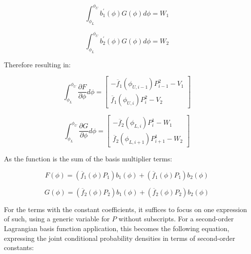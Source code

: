 \documentclass[12pt,a4paper,pagesize=pdftex]{scrartcl}
\begin{document}
\begin{equation*}
    \int_{\phi_L}^{\phi_U} b_1^\prime \left(\phi\right) G\left(\phi\right) d\phi = W_1
\end{equation*}

\begin{equation*}
    \int_{\phi_L}^{\phi_U} b_2^\prime\left(\phi\right) G\left(\phi\right) d\phi = W_2
\end{equation*}

Therefore resulting in:

\begin{equation*}
    \int_{\phi_L}^{\phi_U} \frac{\partial F}{\partial \phi} d\phi =
    \begin{bmatrix}
        - \overline{f}_1\left(\phi_{U,i-1}\right)P^2_{i-1} - V_1 \\
        \overline{f}_1\left(\phi_{U,i}\right)P^2_{i} - V_2
    \end{bmatrix}
\end{equation*}

\begin{equation*}
    \int_{\phi_L}^{\phi_U} \frac{\partial G}{\partial \phi} d\phi =
    \begin{bmatrix}
        -\overline{f}_2\left(\phi_{L,i}\right)P^1_i - W_1 \\
        \overline{f}_2\left(\phi_{L,i+1}\right)P^1_{i+1} - W_2
    \end{bmatrix}
\end{equation*}

As the function is the sum of the basis multiplier terms:

\begin{equation*}
    F\left(\phi\right) = \left(\overline{f}_1\left(\phi\right) P_1\right) b_1\left(\phi\right) + \left(\overline{f}_1\left(\phi\right) P_1\right) b_2\left(\phi\right)
\end{equation*}

\begin{equation*}
    G\left(\phi\right) = \left(\overline{f}_2\left(\phi\right) P_2\right) b_1\left(\phi\right) + \left(\overline{f}_2\left(\phi\right) P_2\right) b_2\left(\phi\right)
\end{equation*}

For the terms with the constant coefficients, it suffices to focus on one expression of such, using a generic variable for \(P\) without subscripts. For a second-order Lagrangian basis function application, this becomes the following equation, expressing the joint conditional probability densities in terms of second-order constants:
\end{document}

